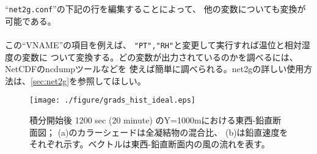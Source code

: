 ``\verb|net2g.conf|''の下記の行を編集することによって、
他の変数についても変換が可能である。\\

\\

\noindent この``VNAME''の項目を例えば、
\verb|"PT","RH"|と変更して実行すれば温位と相対湿度の変数に
ついて変換する。どの変数が出力されているのかを調べるには、NetCDFのncdumpツールなどを
使えば簡単に調べられる。net2gの詳しい使用方法は、\ref{sec:net2g}を参照してほしい。


\begin{figure}[t]
\begin{center}
  \texttt{[image: ./figure/grads\_hist\_ideal.eps]}\\
  \caption{積分開始後 1200 sec (20 minute) のY=1000mにおける東西-鉛直断面図；
           (a)のカラーシェードは全凝結物の混合比、
           (b)は鉛直速度をそれぞれ示す。ベクトルは東西-鉛直断面内の風の流れを表す。}
  \label{fig_ideal}
\end{center}
\end{figure}



